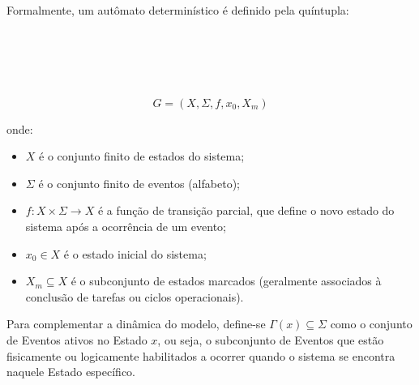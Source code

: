Formalmente, um autômato determinístico é definido pela quíntupla:
\\
\\
\\
\\
\\
\\

\FloatBarrier
\begin{equation}
	G = (X, \Sigma, f, x_0, X_m)
\end{equation}

onde:
\begin{itemize}
	\item $X$ é o conjunto finito de estados do sistema;
	\item $\Sigma$ é o conjunto finito de eventos (alfabeto);
	\item $f: X \times \Sigma \to X$ é a função de transição parcial, que define o novo estado do sistema após a ocorrência de um evento;
	\item $x_0 \in X$ é o estado inicial do sistema;
	\item $X_m \subseteq X$ é o subconjunto de estados marcados (geralmente associados à conclusão de tarefas ou ciclos operacionais).
\end{itemize}

Para complementar a dinâmica do modelo, define-se $\Gamma(x) \subseteq \Sigma$ como o conjunto de Eventos ativos no Estado $x$, ou seja, o subconjunto de Eventos que estão fisicamente ou logicamente habilitados a ocorrer quando o sistema se encontra naquele Estado específico.

